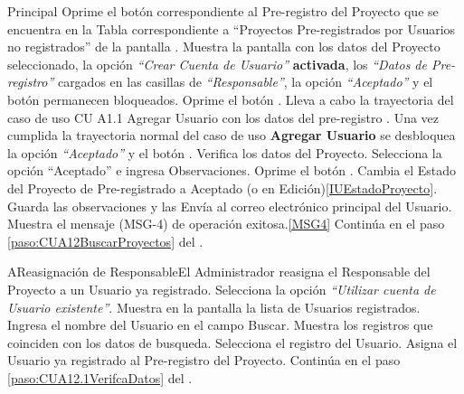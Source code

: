 	\begin{UCtrayectoria}{Principal}
			\UCpaso[\UCactor] Oprime el botón  correspondiente al Pre-registro del Proyecto que se encuentra en la Tabla correspondiente a ``Proyectos Pre-registrados por Usuarios no registrados'' de la pantalla .
			\UCpaso Muestra la pantalla  con los datos del Proyecto seleccionado, la opción \textit{``Crear Cuenta de Usuario''} \textbf{activada}, los \textit{``Datos de Pre-registro''} cargados en las casillas de \textit{``Responsable''}, la opción \textit{``Aceptado''} y el botón  permanecen bloqueados.\label{CrearCuenta}
			\UCpaso[\UCactor] Oprime el botón .
			\UCpaso Lleva a cabo la trayectoria del caso de uso CU A1.1 Agregar Usuario  con los datos del pre-registro .
			\UCpaso Una vez cumplida la trayectoria normal del caso de uso \textbf{Agregar Usuario} se desbloquea la opción \textit{``Aceptado''} y el botón .
			\UCpaso [\UCactor] Verifica los datos del Proyecto.\label{paso:CUA12.1VerifcaDatos}
			\UCpaso [\UCactor] Selecciona la opción ``Aceptado'' e ingresa Observaciones.\label{paso:CUA12.1Aceptar}
			\UCpaso [\UCactor] Oprime el botón .
			\UCpaso Cambia el Estado del Proyecto de Pre-registrado a Aceptado (o en Edición)\ref{IUEstadoProyecto}.
			\UCpaso Guarda las observaciones y las Envía al correo electrónico principal del Usuario.\label{paso:CUA12.1EnviarObservacion}
			\UCpaso Muestra el mensaje (MSG-4) de operación exitosa.\ref{MSG4}
			\UCpaso Continúa en el paso \ref{paso:CUA12BuscarProyectos} del .
	\end{UCtrayectoria}

	\begin{UCtrayectoriaA}{A}{Reasignación de Responsable}{El Administrador reasigna el Responsable del Proyecto a un Usuario ya registrado.}
			\UCpaso[\UCactor] Selecciona la opción \textit{``Utilizar cuenta de Usuario existente''}.
			\UCpaso Muestra en la pantalla la lista de Usuarios registrados.
			\UCpaso [\UCactor] Ingresa el nombre del Usuario en el campo Buscar.
			\UCpaso Muestra los registros que coinciden con los datos de busqueda.
			\UCpaso [\UCactor] Selecciona el registro del Usuario.
			\UCpaso Asigna el Usuario ya registrado al Pre-registro del Proyecto.
			\UCpaso Continúa en el paso \ref{paso:CUA12.1VerifcaDatos} del .
	\end{UCtrayectoriaA}

